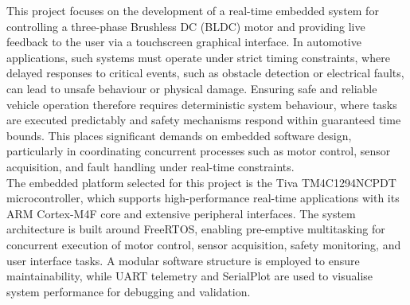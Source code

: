 \documentclass[a4paper, 11pt, titlepage]{article}
\begin{document}
This project focuses on the development of a real-time embedded system for controlling a three-phase Brushless DC (BLDC) motor and providing live feedback to the user via a touchscreen graphical interface. In automotive applications, such systems must operate under strict timing constraints, where delayed responses to critical events, such as obstacle detection or electrical faults, can lead to unsafe behaviour or physical damage. Ensuring safe and reliable vehicle operation therefore requires deterministic system behaviour, where tasks are executed predictably and safety mechanisms respond within guaranteed time bounds. This places significant demands on embedded software design, particularly in coordinating concurrent processes such as motor control, sensor acquisition, and fault handling under real-time constraints.  \\

The embedded platform selected for this project is the Tiva TM4C1294NCPDT microcontroller, which supports high-performance real-time applications with its ARM Cortex-M4F core and extensive peripheral interfaces. The system architecture is built around FreeRTOS, enabling pre-emptive multitasking for concurrent execution of motor control, sensor acquisition, safety monitoring, and user interface tasks. A modular software structure is employed to ensure maintainability, while UART telemetry and SerialPlot are used to visualise system performance for debugging and validation.\\
\end{document}
